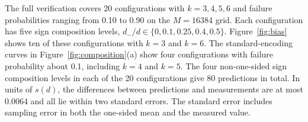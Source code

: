 The full verification covers 20 configurations with $k=3,4,5,6$ and failure probabilities ranging from 0.10 to 0.90 on the $M=16384$ grid. Each configuration has five sign composition levels, $d_-/d\in\{0,0.1,0.25,0.4,0.5\}$. Figure~\ref{fig:bias} shows ten of these configurations with $k=3$ and $k=6$. The standard-encoding curves in Figure~\ref{fig:composition}(a) show four configurations with failure probability about 0.1, including $k=4$ and $k=5$. The four non-one-sided sign composition levels in each of the 20 configurations give 80 predictions in total. In units of $s(d)$, the differences between predictions and measurements are at most 0.0064 and all lie within two standard errors. The standard error includes sampling error in both the one-sided mean and the measured value.
